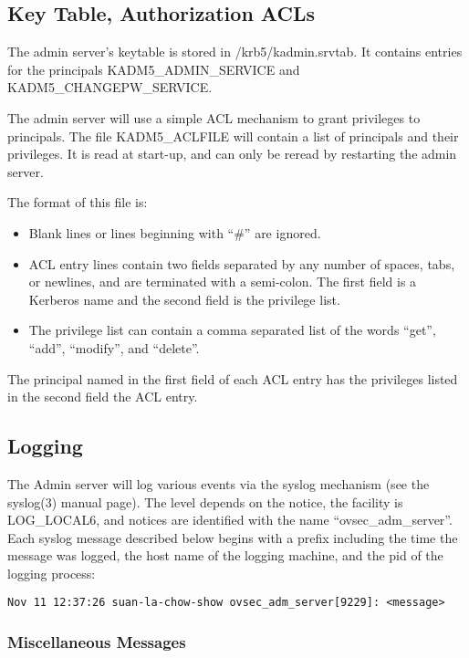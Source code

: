 \subsection{Key Table, Authorization ACLs}
\label{sec:acls}

The admin server's keytable is stored in /krb5/kadmin.srvtab.  It
contains entries for the principals KADM5_ADMIN_SERVICE and
KADM5_CHANGEPW_SERVICE.

The admin server will use a simple ACL mechanism to grant privileges
to principals.  The file KADM5_ACLFILE will contain a
list of principals and their privileges.  It is read at start-up, and
can only be reread by restarting the admin server.

The format of this file is:

\begin{itemize}
\item Blank lines or lines beginning with ``\#'' are ignored.

\item ACL entry lines contain two fields separated by any number of
spaces, tabs, or newlines, and are terminated with a semi-colon.  The
first field is a Kerberos name and the second field is the privilege
list.

\item The privilege list can contain a comma separated list of the
words ``get'', ``add'', ``modify'', and ``delete''.
\end{itemize}

The principal named in the first field of each ACL entry has the
privileges listed in the second field the ACL entry.

\subsection{Logging}

The Admin server will log various events via the syslog mechanism (see
the syslog(3) manual page).  The level depends on the notice, the
facility is LOG_LOCAL6, and notices are identified with the name
``ovsec_adm_server''.  Each syslog message described below begins with
a prefix including the time the message was logged, the host name of
the logging machine, and the pid of the logging process:

\begin{verbatim}
Nov 11 12:37:26 suan-la-chow-show ovsec_adm_server[9229]: <message>
\end{verbatim}

\subsubsection{Miscellaneous Messages}

